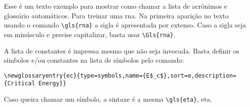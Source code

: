 
Esse é um texto exemplo para mostrar como chamar a lista de acrônimos e glossário automáticos. Para treinar uma \gls{rna}. Na primeira aparição no texto usando o comando \verb|\gls{rna}| a sigla é apresentada por extenso. Caso a sigla seja em minúsculo e precise capitalizar, basta usar \verb|\Gls{rna}|.

A lista de constantes é impressa mesmo que não seja invocada. Basta definir os símbolos e/ou constantes na lista de símbolos pelo comando: 

\verb|\newglossaryentry{ec}{type=symbols,name={E$_c$},sort=e,description={Critical Energy}}|

Caso queira chamar um símbolo, a sintaxe é a mesma \verb|\gls{eta}|, \gls{eta}.

